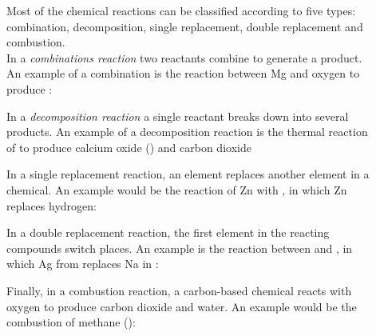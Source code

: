 \documentclass[main.tex]{subfiles}
\begin{document}
\begin{description}
\item[]
Most of the chemical reactions can be classified according to five types: combination, decomposition, single replacement, double replacement and combustion. \\
In a \emph{combinations reaction} two reactants combine to generate a product. An example of a combination is the reaction between Mg and oxygen to produce :
\begin{center}\end{center}
In a \emph{decomposition reaction} a single reactant breaks down into several products. An example of a decomposition reaction is the thermal reaction of  to produce calcium oxide () and carbon dioxide
\begin{center}\end{center}
In a single replacement reaction, an element replaces another element in a chemical. An example would be the reaction of Zn with , in which Zn replaces hydrogen:
\begin{center}\end{center}
In a double replacement reaction, the first element in the reacting compounds switch places. An example is the reaction between  and , in which Ag from  replaces Na in :
\begin{center}\end{center}
Finally, in a combustion reaction, a carbon-based chemical reacts with oxygen to produce carbon dioxide and water. An example would be the combustion of methane ():
\begin{center}\end{center}





\end{description}
\end{document}

